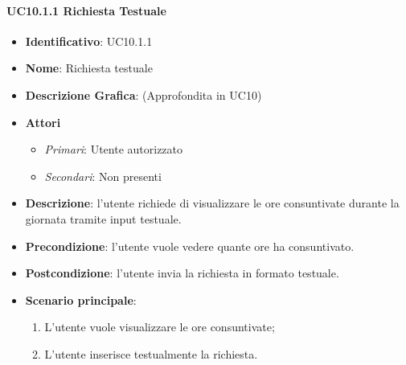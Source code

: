 \paragraph{UC10.1.1 Richiesta Testuale}
\begin{itemize}
	\item \textbf{Identificativo}: UC10.1.1
	\item \textbf{Nome}: Richiesta testuale
	\item \textbf{Descrizione Grafica}: (Approfondita in UC10)
	\item \textbf{Attori}
	\begin{itemize}
		\item \textit{Primari}: Utente autorizzato
		\item \textit{Secondari}: Non presenti
	\end{itemize}
	\item \textbf{Descrizione}: l'utente richiede di visualizzare le ore consuntivate durante la giornata tramite input testuale.
	\item \textbf{Precondizione}: l'utente vuole vedere quante ore ha consuntivato.
	\item \textbf{Postcondizione}: l'utente invia la richiesta in formato testuale.
	\item \textbf{Scenario principale}: 
	\begin{enumerate}
		\item L'utente vuole visualizzare le ore consuntivate;
		\item L'utente inserisce testualmente la richiesta.
	\end{enumerate}
\end{itemize}

